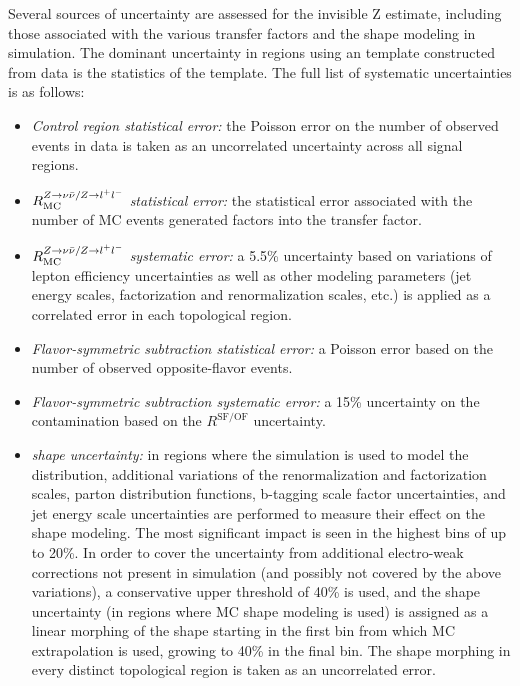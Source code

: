Several sources of uncertainty are assessed for the invisible Z estimate, including those associated with the various transfer factors and the \mttwo shape modeling in simulation. The dominant uncertainty in regions using an \mttwo template constructed from data is the statistics of the template. The full list of systematic uncertainties is as follows:
\begin{itemize}
	\item {\it Control region statistical error:} the Poisson error on the number of observed events in \zll data is taken as an uncorrelated uncertainty across all signal regions.
	\item {\it $R_{\mathrm{MC}}^{Z\rightarrow\nu\bar{\nu}/Z\rightarrow l^+ l^-}$ statistical error:} the statistical error associated with the number of MC events generated factors into the transfer factor.
	\item {\it $R_{\mathrm{MC}}^{Z\rightarrow\nu\bar{\nu}/Z\rightarrow l^+ l^-}$ systematic error:} a 5.5\% uncertainty based on variations of lepton efficiency uncertainties as well as other modeling parameters (jet energy scales, factorization and renormalization scales, etc.) is applied as a correlated error in each topological region.
	\item {\it Flavor-symmetric subtraction statistical error:} a Poisson error based on the number of observed opposite-flavor events.
	\item {\it Flavor-symmetric subtraction systematic error:} a 15\% uncertainty on the \ttbar contamination based on the $R^{\mathrm{SF/OF}}$ uncertainty.
	\item {\it \mttwo shape uncertainty:} in regions where the simulation is used to model the \mttwo distribution, additional variations of the renormalization and factorization scales, parton distribution functions, b-tagging scale factor uncertainties, and jet energy scale uncertainties are performed to measure their effect on the \mttwo shape modeling. The most significant impact is seen in the highest \mttwo bins of up to 20\%. In order to cover the uncertainty from additional electro-weak corrections not present in simulation (and possibly not covered by the above variations), a conservative upper threshold of 40\% is used, and the shape uncertainty (in regions where MC \mttwo shape modeling is used) is assigned as a linear morphing of the \mttwo shape starting in the first bin from which MC extrapolation is used, growing to 40\% in the final bin. The shape morphing in every distinct topological region is taken as an uncorrelated error.
	
\end{itemize}


